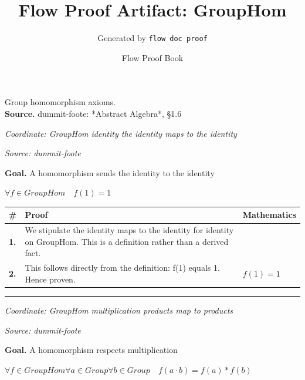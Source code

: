 \documentclass[11pt]{article}
\title{Flow Proof Artifact: GroupHom}
\author{Generated by \texttt{flow doc proof}}
\date{Flow Proof Book}
\theoremstyle{definition}
\begin{document}
\maketitle
Group homomorphism axioms.\\[0.5em]
\textbf{Source.} dummit-foote: *Abstract Algebra*, §1.6\\[0.5em]
\bigskip
{}\par
\smallskip\noindent\textit{Coordinate: GroupHom \cdot identity \cdot the identity maps to the identity}\par
\smallskip\noindent\textit{Source: dummit-foote}\par
\medskip
\noindent\textbf{Goal.} A homomorphism sends the identity to the identity\par
\noindent$\displaystyle \forall f \in GroupHom\quad f(1) = 1$\par
\medskip
\noindent
\begin{tabular}{@{} >{\raggedright\arraybackslash}p{} >{\raggedright\arraybackslash}p{} >{\raggedleft\arraybackslash}p{} @{}}
\textbf{\#} & \textbf{Proof} & \textbf{Mathematics} \\
\midrule
\textbf{1.} & We stipulate the identity maps to the identity for identity on GroupHom. This is a definition rather than a derived fact. & \\[0.45em]
\textbf{2.} & This follows directly from the definition: f(1) equals 1. Hence proven. & $\displaystyle f(1) = 1$ \\[0.45em]
\bottomrule
\end{tabular}
\label{thm:GroupHom-identity-the_identity_maps_to_the_identity}
\par\medskip\hrule
\bigskip
{}\par
\smallskip\noindent\textit{Coordinate: GroupHom \cdot multiplication \cdot products map to products}\par
\smallskip\noindent\textit{Source: dummit-foote}\par
\medskip
\noindent\textbf{Goal.} A homomorphism respects multiplication\par
\noindent$\displaystyle \forall f \in GroupHom \forall a \in Group \forall b \in Group\quad f(a \cdot b) = f(a) * f(b)$\par
\end{document}
